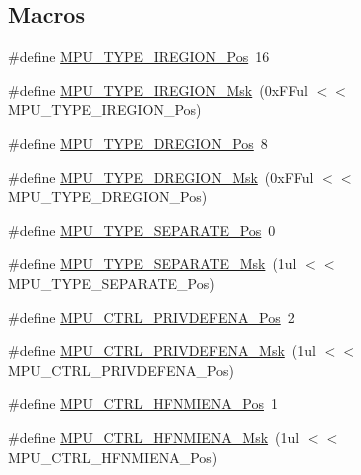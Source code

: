 \subsection*{Macros}
\begin{DoxyCompactItemize}
\item 
\#define \hyperlink{group__CMSIS__CM3__MPU_gab46a4e0dae7607af6f312cf2328ecfc9}{M\+P\+U\+\_\+\+T\+Y\+P\+E\+\_\+\+I\+R\+E\+G\+I\+O\+N\+\_\+\+Pos}~16
\item 
\#define \hyperlink{group__CMSIS__CM3__MPU_ga84c08304cbf7088481f2f6ccd8013c39}{M\+P\+U\+\_\+\+T\+Y\+P\+E\+\_\+\+I\+R\+E\+G\+I\+O\+N\+\_\+\+Msk}~(0x\+F\+Ful $<$$<$ M\+P\+U\+\_\+\+T\+Y\+P\+E\+\_\+\+I\+R\+E\+G\+I\+O\+N\+\_\+\+Pos)
\item 
\#define \hyperlink{group__CMSIS__CM3__MPU_ga4d090ef632d2ba3a6ae4078c2594d6d3}{M\+P\+U\+\_\+\+T\+Y\+P\+E\+\_\+\+D\+R\+E\+G\+I\+O\+N\+\_\+\+Pos}~8
\item 
\#define \hyperlink{group__CMSIS__CM3__MPU_ga3a5d2e6871b1518dca61e28b18aec6cb}{M\+P\+U\+\_\+\+T\+Y\+P\+E\+\_\+\+D\+R\+E\+G\+I\+O\+N\+\_\+\+Msk}~(0x\+F\+Ful $<$$<$ M\+P\+U\+\_\+\+T\+Y\+P\+E\+\_\+\+D\+R\+E\+G\+I\+O\+N\+\_\+\+Pos)
\item 
\#define \hyperlink{group__CMSIS__CM3__MPU_gaa3ef8bc16dfa8b27f80b87109b424fe7}{M\+P\+U\+\_\+\+T\+Y\+P\+E\+\_\+\+S\+E\+P\+A\+R\+A\+T\+E\+\_\+\+Pos}~0
\item 
\#define \hyperlink{group__CMSIS__CM3__MPU_ga45427152e9a3493f1477fbe52e771c59}{M\+P\+U\+\_\+\+T\+Y\+P\+E\+\_\+\+S\+E\+P\+A\+R\+A\+T\+E\+\_\+\+Msk}~(1ul $<$$<$ M\+P\+U\+\_\+\+T\+Y\+P\+E\+\_\+\+S\+E\+P\+A\+R\+A\+T\+E\+\_\+\+Pos)
\item 
\#define \hyperlink{group__CMSIS__CM3__MPU_ga723678c07d8d65eacb5dd957867b1b0c}{M\+P\+U\+\_\+\+C\+T\+R\+L\+\_\+\+P\+R\+I\+V\+D\+E\+F\+E\+N\+A\+\_\+\+Pos}~2
\item 
\#define \hyperlink{group__CMSIS__CM3__MPU_ga09e80ffe9a690dc76e416708661ea436}{M\+P\+U\+\_\+\+C\+T\+R\+L\+\_\+\+P\+R\+I\+V\+D\+E\+F\+E\+N\+A\+\_\+\+Msk}~(1ul $<$$<$ M\+P\+U\+\_\+\+C\+T\+R\+L\+\_\+\+P\+R\+I\+V\+D\+E\+F\+E\+N\+A\+\_\+\+Pos)
\item 
\#define \hyperlink{group__CMSIS__CM3__MPU_gab41c6f2447fb6dffa9a887ddc7c418c5}{M\+P\+U\+\_\+\+C\+T\+R\+L\+\_\+\+H\+F\+N\+M\+I\+E\+N\+A\+\_\+\+Pos}~1
\item 
\#define \hyperlink{group__CMSIS__CM3__MPU_gaa0db6e8e71df9529f3300d7a1e9a7b69}{M\+P\+U\+\_\+\+C\+T\+R\+L\+\_\+\+H\+F\+N\+M\+I\+E\+N\+A\+\_\+\+Msk}~(1ul $<$$<$ M\+P\+U\+\_\+\+C\+T\+R\+L\+\_\+\+H\+F\+N\+M\+I\+E\+N\+A\+\_\+\+Pos)
$$
\end{DoxyCompactItemize}
